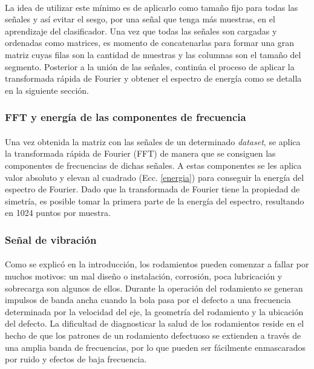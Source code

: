 \documentclass[12pt]{article}%
\begin{document}
\paragraph{}
La idea de utilizar este mínimo es de aplicarlo como tamaño fijo para todas las señales y así evitar el sesgo, por una señal que tenga más muestras, en el aprendizaje del clasificador. Una vez que todas las señales son cargadas y ordenadas como matrices, es momento de concatenarlas para formar una gran matriz cuyas filas son la cantidad de muestras y las columnas son el tamaño del segmento. Posterior a la unión de las señales, continúa el proceso de aplicar la transformada rápida de Fourier y obtener el espectro de energía como se detalla en la siguiente sección.

\subsubsection{FFT y energía de las componentes de frecuencia}
\paragraph{}
Una vez obtenida la matriz con las señales de un determinado \textit{dataset}, se aplica la transformada rápida de Fourier (FFT) de manera que se consiguen las componentes de frecuencias de dichas señales. A estas componentes se les aplica valor absoluto y elevan al cuadrado (Ecc. \ref{energia}) para conseguir la energía del espectro de Fourier. Dado que la transformada de Fourier tiene la propiedad de simetría, es posible tomar la primera parte de la energía del espectro, resultando en 1024 puntos por muestra.

\subsubsection{Señal de vibración}
\paragraph{}
Como se explicó en la introducción, los rodamientos pueden comenzar a fallar por muchos motivos: un mal diseño o instalación, corrosión, poca lubricación y sobrecarga son algunos de ellos. Durante la operación del rodamiento se generan impulsos de banda ancha cuando la bola pasa por el defecto a una frecuencia determinada por la velocidad del eje, la geometría del rodamiento y la ubicación del defecto. La dificultad de diagnosticar la salud de los rodamientos reside en el hecho de que los patrones de un rodamiento defectuoso se extienden a través de una amplia banda de frecuencias, por lo que pueden ser fácilmente enmascarados por ruido y efectos de baja frecuencia.
\end{document}
